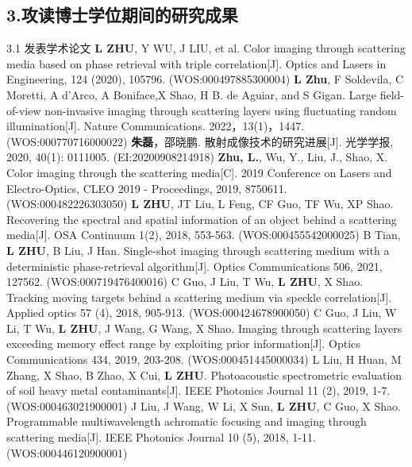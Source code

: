 \begin{resume}
\section*{3.\hspace{0.75em}攻读博士学位期间的研究成果}
\begin{resumelist}{\hspace{-0.25em}3.1\hspace{0.5em} 发表学术论文}
\resumelistitem \textbf{L ZHU}, Y WU, J LIU, et al. Color imaging through scattering media based on phase retrieval with triple correlation[J]. Optics and Lasers in Engineering, 124 (2020), 105796. (WOS:000497885300004)
\resumelistitem \textbf{L Zhu}, F Soldevila, C Moretti, A d'Arco, A Boniface,X Shao, H B. de Aguiar, and S Gigan. Large field-of-view non-invasive imaging through scattering layers using fluctuating random illumination[J]. Nature Communications. 2022，13(1)，1447. (WOS:000770716000022)
\resumelistitem \textbf{朱磊}，邵晓鹏. 散射成像技术的研究进展[J]. 光学学报, 2020, 40(1): 0111005. (EI:20200908214918)
\resumelistitem \textbf{Zhu, L.}, Wu, Y., Liu, J., Shao, X. Color imaging through the scattering media[C]. 2019 Conference on Lasers and Electro-Optics, CLEO 2019 - Proceedings, 2019, 8750611. (WOS:000482226303050)
\resumelistitem \textbf{L ZHU}, JT Liu, L Feng, CF Guo, TF Wu, XP Shao. Recovering the spectral and spatial information of an object behind a scattering media[J]. OSA Continuum 1(2), 2018, 553-563. (WOS:000455542000025)
\resumelistitem B Tian, \textbf{L ZHU}, B Liu, J Han. Single-shot imaging through scattering medium with a deterministic phase-retrieval algorithm[J]. Optics Communications 506, 2021, 127562. (WOS:000719476400016)
\resumelistitem C Guo, J Liu, T Wu, \textbf{L ZHU}, X Shao. Tracking moving targets behind a scattering medium via speckle correlation[J]. Applied optics 57 (4), 2018, 905-913. (WOS:000424678900050)
\resumelistitem C Guo, J Liu, W Li, T Wu, \textbf{L ZHU}, J Wang, G Wang, X Shao. Imaging through scattering layers exceeding memory effect range by exploiting prior information[J]. Optics Communications 434, 2019, 203-208. (WOS:000451445000034)
\resumelistitem L Liu, H Huan, M Zhang, X Shao, B Zhao, X Cui, \textbf{L ZHU}. Photoacoustic spectrometric evaluation of soil heavy metal contaminants[J]. IEEE Photonics Journal 11 (2), 2019, 1-7. (WOS:000463021900001)
\resumelistitem J Liu, J Wang, W Li, X Sun, \textbf{L ZHU}, C Guo, X Shao. Programmable multiwavelength achromatic focusing and imaging through scattering media[J]. IEEE Photonics Journal 10 (5), 2018, 1-11. (WOS:000446120900001)
\end{resumelist}


\end{resume}
